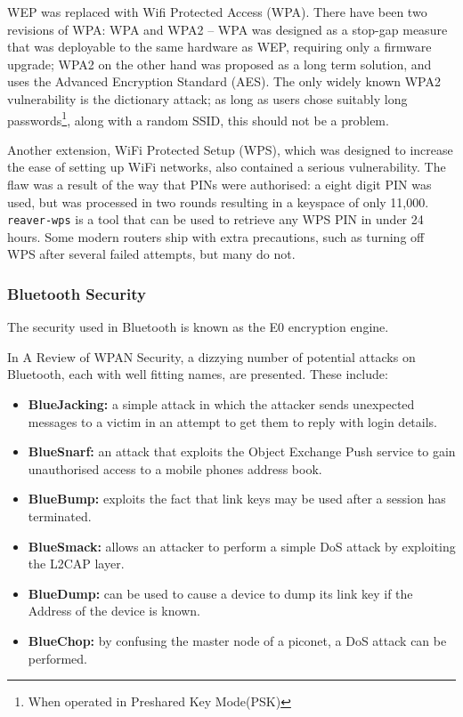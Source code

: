 \documentclass[10pt,journal,compsoc]{IEEEtran}
\begin{document}
WEP was replaced with Wifi Protected Access (WPA). There have been two
revisions of WPA: WPA and WPA2 -- WPA was designed as a stop-gap measure that
was deployable to the same hardware as WEP, requiring only a firmware upgrade;
WPA2 on the other hand was proposed as a long term solution, and uses the
Advanced Encryption Standard (AES). The only widely known WPA2 vulnerability is
the dictionary attack; as long as users chose suitably long
passwords\footnote{When operated in Preshared Key Mode(PSK)}, along with a
random SSID, this should not be a problem. 

Another extension, WiFi Protected Setup (WPS), which was designed to increase
the ease of setting up WiFi networks, also contained a serious vulnerability.
The flaw was a result of the way that PINs were authorised: a eight digit PIN
was used, but was processed in two rounds resulting in a keyspace of only
11,000. {\tt reaver-wps} is a tool that can be used to retrieve any WPS PIN in
under 24 hours. Some modern routers ship with extra precautions, such as
turning off WPS after several failed attempts, but many do not. 

\subsubsection{Bluetooth Security}
The security used in Bluetooth is known as the E0 encryption engine. 

In A Review of WPAN Security\cite{Kennedy2008}, a dizzying number of potential
attacks on Bluetooth, each with well fitting names, are presented. These include: 
\begin{itemize}[$\bullet$]
\item {\bf BlueJacking:} a simple attack in which the attacker sends unexpected
messages to a victim in an attempt to get them to reply with login details. 
\item {\bf BlueSnarf:} an attack that exploits the Object Exchange Push service to
gain unauthorised access to a mobile phones address book. 
\item {\bf BlueBump:} exploits the fact that link keys may be used after a session
has terminated. 
\item {\bf BlueSmack:} allows an attacker to perform a simple DoS attack by
exploiting the L2CAP layer.
\item {\bf BlueDump:} can be used to cause a device to dump its link key if the
 Address of the device is known. 
\item {\bf BlueChop:} by confusing the master node of a piconet, a DoS attack can be
performed. 
\end{itemize}
\end{document}
